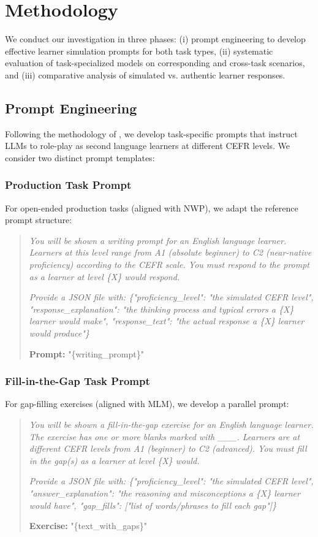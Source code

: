 \section{Methodology}

We conduct our investigation in three phases: (i) prompt engineering to develop effective learner simulation prompts for both task types, (ii) systematic evaluation of task-specialized models on corresponding and cross-task scenarios, and (iii) comparative analysis of simulated vs. authentic learner responses.

\subsection{Prompt Engineering}

Following the methodology of \citet{benedetto2024using}, we develop task-specific prompts that instruct LLMs to role-play as second language learners at different CEFR levels. We consider two distinct prompt templates:

\subsubsection{Production Task Prompt}

For open-ended production tasks (aligned with NWP), we adapt the reference prompt structure:

\begin{quote}
\textit{You will be shown a writing prompt for an English language learner. Learners at this level range from A1 (absolute beginner) to C2 (near-native proficiency) according to the CEFR scale. You must respond to the prompt as a learner at level \{X\} would respond.}

\textit{Provide a JSON file with: \{"proficiency\_level": "the simulated CEFR level", "response\_explanation": "the thinking process and typical errors a \{X\} learner would make", "response\_text": "the actual response a \{X\} learner would produce"\}}

\textbf{Prompt:} "\{writing\_prompt\}"
\end{quote}

\subsubsection{Fill-in-the-Gap Task Prompt}

For gap-filling exercises (aligned with MLM), we develop a parallel prompt:

\begin{quote}
\textit{You will be shown a fill-in-the-gap exercise for an English language learner. The exercise has one or more blanks marked with \_\_\_. Learners are at different CEFR levels from A1 (beginner) to C2 (advanced). You must fill in the gap(s) as a learner at level \{X\} would.}

\textit{Provide a JSON file with: \{"proficiency\_level": "the simulated CEFR level", "answer\_explanation": "the reasoning and misconceptions a \{X\} learner would have", "gap\_fills": ["list of words/phrases to fill each gap"]\}}

\textbf{Exercise:} "\{text\_with\_gaps\}"
\end{quote}

